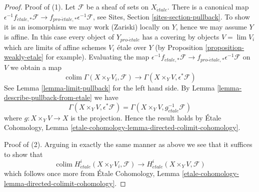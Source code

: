 \documentclass[10pt,a4paper]{amsart}
\theoremstyle{plain}
\theoremstyle{definition}
\theoremstyle{remark}
\numberwithin{equation}{subsection}
\def\lim{\mathop{\mathrm{lim}}\nolimits}
\def\colim{\mathop{\mathrm{colim}}\nolimits}
\def\proetale{{pro\text{-}\acute{e}tale}}
\def\etale{{\acute{e}tale}}
\begin{document}
\begin{proof}
Proof of (1). Let $\mathcal{F}$ be a sheaf of sets on $X_\etale$. There
is a canonical map $\epsilon^{-1}f_{\etale, *}\mathcal{F} \to
f_{\proetale, *}\epsilon^{-1}\mathcal{F}$, see
Sites, Section \ref{sites-section-pullback}.
To show it is an isomorphism we may work (Zariski) locally on $Y$, hence
we may assume $Y$ is affine. In this case
every object of $Y_\proetale$ has a covering by objects $V = \lim V_i$
which are limits of affine schemes $V_i$ \'etale over $Y$ (by
Proposition \ref{proposition-weakly-etale}
for example). Evaluating the map
$\epsilon^{-1}f_{\etale, *}\mathcal{F} \to
f_{\proetale, *}\epsilon^{-1}\mathcal{F}$
on $V$ we obtain a map
$$
\colim \Gamma(X \times_Y V_i, \mathcal{F})
\longrightarrow
\Gamma(X \times_Y V, \epsilon^*\mathcal{F})
$$
See Lemma \ref{lemma-limit-pullback} for the left hand side.
By Lemma \ref{lemma-describe-pullback-from-etale} we have
$$
\Gamma(X \times_Y V, \epsilon^*\mathcal{F}) =
\Gamma(X \times_Y V, g_\etale^{-1}\mathcal{F})
$$
where $g : X \times_Y V \to X$ is the projection. Hence the result holds by
\'Etale Cohomology, Lemma
\ref{etale-cohomology-lemma-directed-colimit-cohomology}.

\medskip\noindent
Proof of (2). Arguing in exactly the same manner as above
we see that it suffices to show that
$$
\colim H^i_\etale(X \times_Y V_i, \mathcal{F})
\longrightarrow
H^i_\etale(X \times_Y V, \mathcal{F})
$$
which follows once more from \'Etale Cohomology, Lemma
\ref{etale-cohomology-lemma-directed-colimit-cohomology}.
\end{proof}
\end{document}

